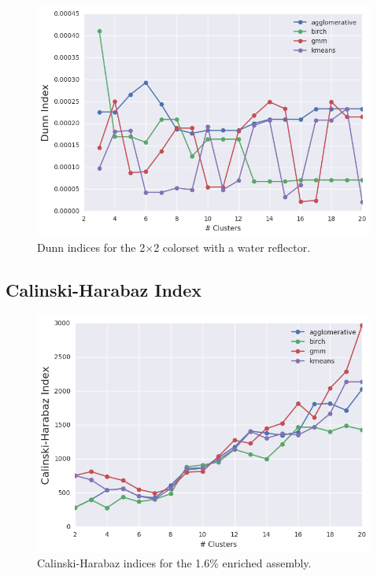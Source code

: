\begin{figure}[h!]
\centering
\includegraphics[width=0.87\linewidth]{figures/results/model-select/reflector/dunn-combined-U238-nu-fission-1}
\vspace{2mm}
\caption[Dunn indices for the 2$\times$2 colorset with reflector]{Dunn indices for the 2$\times$2 colorset with a water reflector.}
\label{fig:chap11-refl-dunn-index}
\end{figure}

\clearpage

\subsection{Calinski-Harabaz Index}
\label{subsec:chap11-ch-index}

\begin{figure}[h!]
\centering
\includegraphics[width=0.87\linewidth]{figures/results/model-select/assm-16/ch-combined-U238-capture-1}
\vspace{2mm}
\caption[Calinski-Harabaz indices for the 1.6\% enriched assembly]{Calinski-Harabaz indices for the 1.6\% enriched assembly.}
\label{fig:chap11-assm-16-ch-index}
\end{figure}

